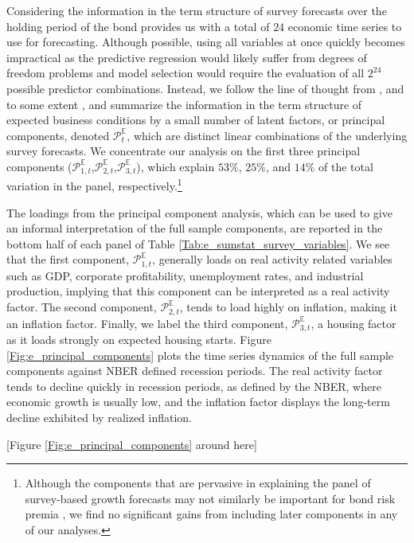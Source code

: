 \documentclass[12pt,letterpaper,leqno,doublespacing]{article}
\begin{document}
Considering the information in the term structure of survey forecasts over the holding period of the bond provides us with a total of $24$ economic time series to use for forecasting. Although possible, using all variables at once quickly becomes impractical as the predictive regression would likely suffer from degrees of freedom problems and model selection would require the evaluation of all $2^{24}$ possible predictor combinations. Instead, we follow the line of thought from \cite{LudvigsonNg2009}, and to some extent \cite{LittermanScheinkman1991}, and summarize the information in the term structure of expected business conditions by a small number of latent factors, or principal components, denoted $\mathcal{P}_{t}^{\mathbb{E}}$, which are distinct linear combinations of the underlying survey forecasts. We concentrate our analysis on the first three principal components ($\mathcal{P}_{1,t}^{\mathbb{E}}$,$\mathcal{P}_{2,t}^{\mathbb{E}}$,$\mathcal{P}_{3,t}^{\mathbb{E}}$), which explain $53\%$, $25\%$, and $14\%$ of the total variation in the panel, respectively.\footnote{Although the components that are pervasive in explaining the panel of survey-based growth forecasts may not similarly be important for bond risk premia \citep{BaiNg2008a}, we find no significant gains from including later components in any of our analyses.} 

The loadings from the principal component analysis, which can be used to give an informal interpretation of the full sample components, are reported in the bottom half of each panel of Table \ref{Tab:e_sumstat_survey_variables}. We see that the first component, $\mathcal{P}_{1,t}^{\mathbb{E}}$, generally loads on real activity related variables such as GDP, corporate profitability, unemployment rates, and industrial production, implying that this component can be interpreted as a real activity factor. The second component, $\mathcal{P}_{2,t}^{\mathbb{E}}$, tends to load highly on inflation, making it an inflation factor. Finally, we label the third component, $\mathcal{P}_{3,t}^{\mathbb{E}}$, a housing factor as it loads strongly on expected housing starts. Figure \ref{Fig:e_principal_components} plots the time series dynamics of the full sample components against NBER defined recession periods. The real activity factor tends to decline quickly in recession periods, as defined by the NBER, where economic growth is usually low, and the inflation factor displays the long-term decline exhibited by realized inflation. 

\begin{center}
    [Figure \ref{Fig:e_principal_components} around here]
\end{center}
\end{document}
